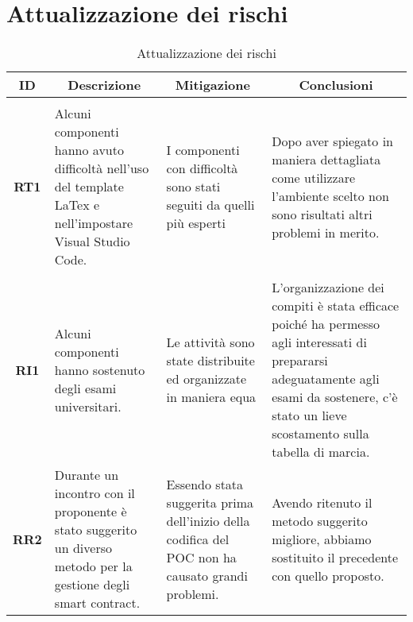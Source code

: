 \appendix

\section{Attualizzazione dei rischi} \label{section:attualizzazione_dei_rischi}
\begin{table}[H]
  \centering
  \renewcommand{\arraystretch}{1.8}
  \begin{tabular}{c|p{5cm}|p{5cm}|p{5cm}}
    \rowcolor[HTML]{125E28}
    \color[HTML]{FFFFFF}\textbf{ID}
    & \multicolumn{1}{c|}{\color[HTML]{FFFFFF}\textbf{Descrizione}}
    & \multicolumn{1}{c}{\color[HTML]{FFFFFF}\textbf{Mitigazione}}
    & \multicolumn{1}{c|}{\color[HTML]{FFFFFF}\textbf{Conclusioni}}\\
    \hline
    \rowcolor[HTML]{6BC26B}
    \multicolumn{4}{c}{\textbf{Analisi preliminare}}\\
    \hline
    \textbf{RT1} & Alcuni componenti hanno avuto difficoltà nell'uso del template LaTex e nell'impostare Visual Studio Code. & I componenti con difficoltà sono stati seguiti da quelli più esperti & Dopo aver spiegato in maniera dettagliata come utilizzare l'ambiente scelto non sono risultati altri problemi in merito.\\
    \hline
    \rowcolor[HTML]{6BC26B}
    \multicolumn{4}{c}{\textbf{Progettazione della Technology Baseline}}\\
    \hline
    \textbf{RI1} & Alcuni componenti hanno sostenuto degli esami universitari. & Le attività sono state distribuite ed organizzate in maniera equa & L'organizzazione dei compiti è stata efficace poiché ha permesso agli interessati di prepararsi adeguatamente agli esami da sostenere, c'è stato un lieve scostamento sulla tabella di marcia.\\
    \hline
    \textbf{RR2} & Durante un incontro con il proponente è stato suggerito un diverso metodo per la gestione degli smart contract. & Essendo stata suggerita prima dell'inizio della codifica del POC non ha causato grandi problemi. & Avendo ritenuto il metodo suggerito migliore, abbiamo sostituito il precedente con quello proposto.\\
  \end{tabular}
  \caption{Attualizzazione dei rischi}
\end{table}